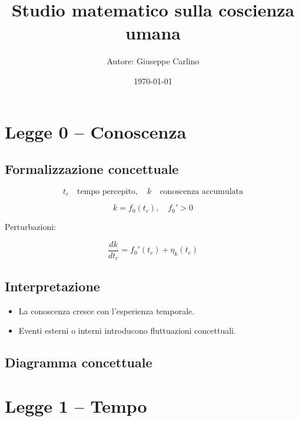 \documentclass[12pt,a4paper]{article}
\title{\centering Studio matematico sulla coscienza umana}
\author{Autore: Giuseppe Carlino}
\date{\today}
\begin{document}
\maketitle
\tableofcontents
\newpage

\section{Legge 0 – Conoscenza}

\subsection{Formalizzazione concettuale}

\[
t_c \quad \text{tempo percepito}, \quad k \quad \text{conoscenza accumulata}
\]

\[
k = f_0(t_c), \quad f_0'>0
\]

Perturbazioni:

\[
\frac{dk}{dt_c} = f_0'(t_c) + \eta_k(t_c)
\]

\subsection{Interpretazione}

\begin{itemize}
    \item La conoscenza cresce con l’esperienza temporale.
    \item Eventi esterni o interni introducono fluttuazioni concettuali.
\end{itemize}

\subsection{Diagramma concettuale}
\begin{center}
\end{center}

\newpage
\section{Legge 1 – Tempo}
\end{document}
